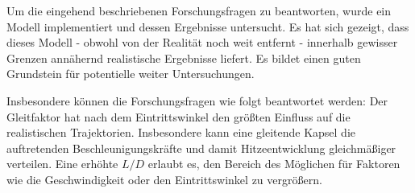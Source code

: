 Um die eingehend beschriebenen Forschungsfragen zu beantworten, wurde ein Modell implementiert und dessen Ergebnisse untersucht. Es hat sich gezeigt, dass dieses Modell - obwohl von der Realität noch weit entfernt - innerhalb gewisser Grenzen annähernd realistische Ergebnisse liefert. Es bildet einen guten Grundstein für potentielle weiter Untersuchungen.

Insbesondere können die Forschungsfragen wie folgt beantwortet werden: Der Gleitfaktor hat nach dem Eintrittswinkel den größten Einfluss auf die realistischen Trajektorien. Insbesondere kann eine gleitende Kapsel die auftretenden Beschleunigungskräfte und damit Hitzeentwicklung gleichmäßiger verteilen. Eine erhöhte $L/D$ erlaubt es, den Bereich des Möglichen für Faktoren wie die Geschwindigkeit oder den Eintrittswinkel zu vergrößern.